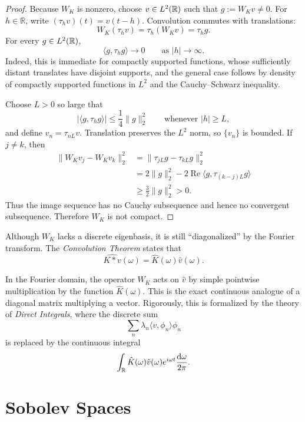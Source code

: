 \begin{proof}
Because $W_K$ is nonzero, choose $v\in L^2(\mathbb{R})$ such that
$g:=W_Kv\neq0$. For $h\in\mathbb{R}$, write
$(\tau_hv)(t)=v(t-h)$. Convolution commutes with translations:
\[
W_K(\tau_hv)=\tau_h(W_Kv)=\tau_hg.
\]
For every $g\in L^2(\mathbb{R})$,
\[
\langle g,\tau_hg\rangle\longrightarrow0
\qquad\text{as }|h|\to\infty.
\]
Indeed, this is immediate for compactly supported functions, whose
sufficiently distant translates have disjoint supports, and the general
case follows by density of compactly supported functions in $L^2$ and the
Cauchy--Schwarz inequality.

Choose $L>0$ so large that
\[
|\langle g,\tau_hg\rangle|\leq\frac14\|g\|_2^2 \qquad\text{whenever }|h|\geq L,
\] and define $v_n=\tau_{nL}v$. Translation preserves the $L^2$ norm, so
$\{v_n\}$ is bounded. If $j\neq k$, then
\[
\begin{aligned}
\|W_Kv_j-W_Kv_k\|_2^2
&=\|\tau_{jL}g-\tau_{kL}g\|_2^2\\
&=2\|g\|_2^2
-2\operatorname{Re}\langle g,\tau_{(k-j)L}g\rangle\\
&\geq\frac32\|g\|_2^2>0.
\end{aligned}
\]
Thus the image sequence has no Cauchy subsequence and hence no convergent
subsequence. Therefore $W_K$ is not compact.
\end{proof}

\begin{remark}
Although $W_K$ lacks a discrete eigenbasis, it is still ``diagonalized'' by the Fourier transform. The \textit{Convolution Theorem} states that
\[
\widehat{K * v}(\omega) = \hat{K}(\omega) \hat{v}(\omega).
\]

In the Fourier domain, the operator $W_K$ acts on $\hat{v}$ by simple pointwise multiplication by the function $\hat{K}(\omega)$. This is the exact continuous analogue of a diagonal matrix multiplying a vector. Rigorously, this is formalized by the theory of \textit{Direct Integrals}, where the discrete sum
\[
\sum_n \lambda_n \langle v, \phi_n \rangle \phi_n
\]
is replaced by the continuous integral
\[
\int_{\mathbb{R}} \hat{K}(\omega) \hat{v}(\omega) e^{i\omega t} \frac{\mathrm{d} \omega}{2\pi}.
\]

\end{remark}

\section{Sobolev Spaces}

